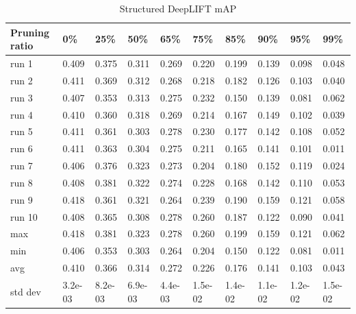 \documentclass[journal,onecolumn,12pt]{IEEEtran}
\begin{document}
\begin{table}[htbp]
    \caption{Structured DeepLIFT mAP}
    \begin{center}
    \begin{tabular}{ |p{2cm}|p{1cm}|p{1cm}|p{1cm}|p{1cm}|p{1cm}|p{1cm}|p{1cm}|p{1cm}|p{1cm}|  }
     \hline
     Pruning ratio  & 0\% & 25\%& 50\%& 65\%& 75\%& 85\%& 90\%& 95\%& 99\%\\
     \hline
     run 1&0.409&0.375&0.311&0.269&0.220&0.199&0.139&0.098&0.048\\
     run 2&0.411&0.369&0.312&0.268&0.218&0.182&0.126&0.103&0.040\\
     run 3&0.407&0.353&0.313&0.275&0.232&0.150&0.139&0.081&0.062\\
     run 4&0.410&0.360&0.318&0.269&0.214&0.167&0.149&0.102&0.039\\
     run 5&0.411&0.361&0.303&0.278&0.230&0.177&0.142&0.108&0.052\\
     run 6&0.411&0.363&0.304&0.275&0.211&0.165&0.141&0.101&0.011\\
     run 7&0.406&0.376&0.323&0.273&0.204&0.180&0.152&0.119&0.024\\
     run 8&0.408&0.381&0.322&0.274&0.228&0.168&0.142&0.110&0.053\\
     run 9&0.418&0.361&0.321&0.264&0.239&0.190&0.159&0.121&0.058\\
     run 10&0.408&0.365&0.308&0.278&0.260&0.187&0.122&0.090&0.041\\
     \hline
        max     &0.418&0.381&0.323&0.278&0.260&0.199&0.159&0.121&0.062\\
        min     &0.406&0.353&0.303&0.264&0.204&0.150&0.122&0.081&0.011\\
        avg     &0.410&0.366&0.314&0.272&0.226&0.176&0.141&0.103&0.043\\
        std dev &3.2e-03&8.2e-03&6.9e-03&4.4e-03&1.5e-02&1.4e-02&1.1e-02&1.2e-02&1.5e-02\\
     \hline
    \end{tabular}
    \end{center}
    \label{tab:a3}
\end{table}
\end{document}
